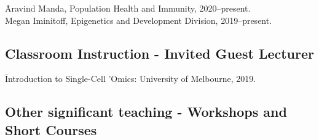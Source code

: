 \documentclass[11pt,letterpaper,pdf]{article}
\newcommand{\teach}[3]{%
  \vspace*{0.3\baselineskip}
  {#1}.\newline {\it #3}. #2.}
\begin{document}
{\begin{tabbing}
  \=Aravind Manda, Population Health and Immunity, 2020--present.\\
  \>Megan Iminitoff, Epigenetics and Development Division, 2019--present.\\
\end{tabbing}


\subsection*{Classroom Instruction - Invited Guest Lecturer}

\begin{tabbing}
  \=Introduction to Single-Cell 'Omics: University of Melbourne, 2019.
\end{tabbing}



\subsection*{Other significant teaching - Workshops and Short Courses}


%
%
%
%
%
%
%
%

}
\end{document}
